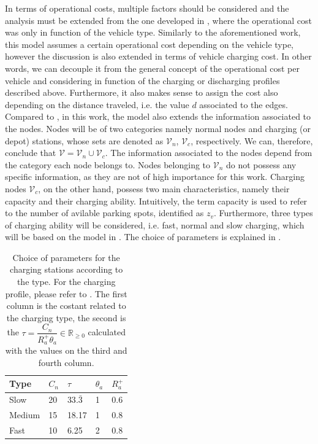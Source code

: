 In terms of operational costs, multiple factors should be considered and the analysis must be extended from the one developed in \cite{project_thesis}, where the operational cost was only in function of the vehicle type. Similarly to the aforementioned work, this model assumes a certain operational cost depending on the vehicle type, however the discussion is also extended in terms of vehicle charging cost. In other words, we can decouple it from the general concept of the operational cost per vehicle and considering in function of the charging or discharging profiles described above. Furthermore, it also makes sense to assign the cost also depending on the distance traveled, i.e. the value $d$ associated to the edges. \\
Compared to \cite{project_thesis}, in this work, the model also extends the information associated to the nodes. Nodes will be of two categories namely normal nodes and charging (or depot) stations, whose sets are denoted as $\mathcal{V}_n$, $\mathcal{V}_c$, respectively. We can, therefore, conclude that $\mathcal{V} = \mathcal{V}_n \cup \mathcal{V}_c$. The information associated to the nodes depend from the category each node belongs to. Nodes belonging to $\mathcal{V}_n$ do not possess any specific information, as they are not of high importance for this work. Charging nodes $\mathcal{V}_c$, on the other hand, possess two main characteristics, namely their capacity and their charging ability. Intuitively, the term capacity is used to refer to the number of avilable parking spots, identified as $z_v$. Furthermore, three types of charging ability will be considered, i.e. fast, normal and slow charging, which will be based on the model in . The choice of parameters is explained in . 
\begin{table}[th]
	\centering
\begin{tabular}{ |p{2cm}|p{1cm}|p{1cm}|p{1cm}|p{1cm}|}
	\hline
	Type&$C_n$  &$\tau$&$\theta_a$&$R^+_a$ \\
	\hline
	Slow & 20 &$33.\bar{3}$&1&0.6  \\
	Medium &15 &18.17& 1   & 0.8\\
	Fast & 10 & 6.25&2& 0.8\\
	\hline
\end{tabular}
	\caption[Parameters choice for the Chargin Stations]{Choice of parameters for the charging stations according to the type. For the charging profile, please refer to . The first column is the costant related to the charging type, the second is the $\tau= \dfrac{C_n}{R^+_a\theta_a}\in \mathbb{R}_{\ge0}$ calculated with the values on the third and fourth column. }
	\label{tab:charging_stations}	
\end{table}\\

